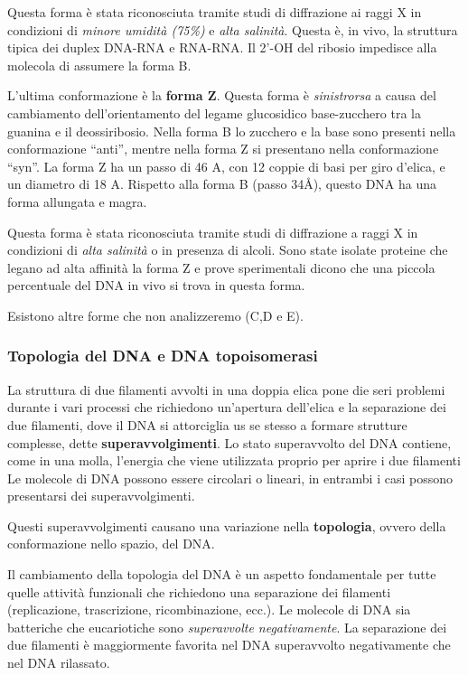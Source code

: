 \documentclass[]{article}
\begin{document}
Questa forma è stata riconosciuta tramite studi di diffrazione ai raggi
X in condizioni di \emph{minore umidità (75\%)} e \emph{alta salinità}.
Questa è, in vivo, la struttura tipica dei duplex DNA-RNA e RNA-RNA. Il
2'-OH del ribosio impedisce alla molecola di assumere la forma B.

L'ultima conformazione è la \textbf{forma Z}. Questa forma è
\emph{sinistrorsa} a causa del cambiamento dell'orientamento del legame
glucosidico base-zucchero tra la guanina e il deossiribosio. Nella forma
B lo zucchero e la base sono presenti nella conformazione ``anti'',
mentre nella forma Z si presentano nella conformazione ``syn''. La forma
Z ha un passo di 46 A, con 12 coppie di basi per giro d'elica, e un
diametro di 18 A. Rispetto alla forma B (passo 34Å), questo DNA ha una
forma allungata e magra.

Questa forma è stata riconosciuta tramite studi di diffrazione a raggi X
in condizioni di \emph{alta salinità} o in presenza di alcoli. Sono
state isolate proteine che legano ad alta affinità la forma Z e prove
sperimentali dicono che una piccola percentuale del DNA in vivo si trova
in questa forma.

Esistono altre forme che non analizzeremo (C,D e E).

\subsubsection{Topologia del DNA e DNA
topoisomerasi}\label{topologia-del-dna-e-dna-topoisomerasi}

La struttura di due filamenti avvolti in una doppia elica pone die seri
problemi durante i vari processi che richiedono un'apertura dell'elica e
la separazione dei due filamenti, dove il DNA si attorciglia us se
stesso a formare strutture complesse, dette \textbf{superavvolgimenti}.
Lo stato superavvolto del DNA contiene, come in una molla, l'energia che
viene utilizzata proprio per aprire i due filamenti Le molecole di DNA
possono essere circolari o lineari, in entrambi i casi possono
presentarsi dei superavvolgimenti.

Questi superavvolgimenti causano una variazione nella
\textbf{topologia}, ovvero della conformazione nello spazio, del DNA.

Il cambiamento della topologia del DNA è un aspetto fondamentale per
tutte quelle attività funzionali che richiedono una separazione dei
filamenti (replicazione, trascrizione, ricombinazione, ecc.). Le
molecole di DNA sia batteriche che eucariotiche sono \emph{superavvolte
negativamente}. La separazione dei due filamenti è maggiormente favorita
nel DNA superavvolto negativamente che nel DNA rilassato.
\end{document}
